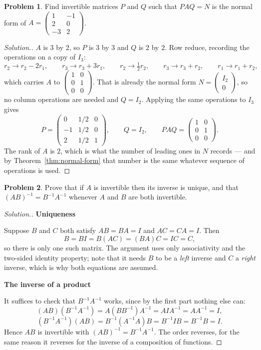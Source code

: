 \documentclass[11pt,a4paper]{article}
\theoremstyle{definition}
\newtheorem{problemx}{Problem}[section]
\newenvironment{problem}{\begin{problemx}}{\end{problemx}}
\newenvironment{solution}
  {\renewcommand{\qedsymbol}{}\begin{proof}[\textit{Solution}.]}
  {\end{proof}}
\newcommand{\subhead}[1]{%
  \par\medskip\noindent\textbf{#1}\par\nobreak\smallskip}
\begin{document}
\begin{problem}
Find invertible matrices $P$ and $Q$ such that $PAQ=N$ is the normal form of
$A=\begin{pmatrix}1&-1\\2&0\\-3&2\end{pmatrix}$.
\end{problem}
\begin{solution}
$A$ is $3$ by $2$, so $P$ is $3$ by $3$ and $Q$ is $2$ by $2$. Row reduce,
recording the operations on a copy of $I_3$:
$$r_2\rightarrow r_2-2r_1,\qquad r_3\rightarrow r_3+3r_1,\qquad
r_2\rightarrow \tfrac{1}{2}r_2,\qquad r_3\rightarrow r_3+r_2,\qquad
r_1\rightarrow r_1+r_2,$$
which carries $A$ to $\begin{pmatrix}1&0\\0&1\\0&0\end{pmatrix}$. That is
already the normal form $N=\begin{pmatrix}I_2\\0\end{pmatrix}$, so no column
operations are needed and $Q=I_2$. Applying the same operations to $I_3$ gives
$$P=\begin{pmatrix}0&1/2&0\\-1&1/2&0\\2&1/2&1\end{pmatrix},\qquad Q=I_2,
\qquad PAQ=\begin{pmatrix}1&0\\0&1\\0&0\end{pmatrix}.$$
The rank of $A$ is $2$, which is what the number of leading ones in $N$ records
--- and by Theorem~\ref{thm:normal-form} that number is the same whatever
sequence of operations is used.
\end{solution}

\begin{problem}
Prove that if $A$ is invertible then its inverse is unique, and that
$(AB)^{-1}=B^{-1}A^{-1}$ whenever $A$ and $B$ are both invertible.
\end{problem}
\begin{solution}
\subhead{Uniqueness}
Suppose $B$ and $C$ both satisfy $AB=BA=I$ and $AC=CA=I$. Then
$$B=BI=B(AC)=(BA)C=IC=C,$$
so there is only one such matrix. The argument uses only associativity and the
two-sided identity property; note that it needs $B$ to be a \emph{left} inverse
and $C$ a \emph{right} inverse, which is why both equations are assumed.

\subhead{The inverse of a product}
It suffices to check that $B^{-1}A^{-1}$ works, since by the first part nothing
else can:
$$(AB)(B^{-1}A^{-1})=A(BB^{-1})A^{-1}=AIA^{-1}=AA^{-1}=I,$$
$$(B^{-1}A^{-1})(AB)=B^{-1}(A^{-1}A)B=B^{-1}IB=B^{-1}B=I.$$
Hence $AB$ is invertible with $(AB)^{-1}=B^{-1}A^{-1}$. The order reverses, for
the same reason it reverses for the inverse of a composition of functions.
\end{solution}
\end{document}
